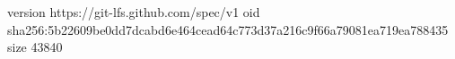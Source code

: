 version https://git-lfs.github.com/spec/v1
oid sha256:5b22609be0dd7dcabd6e464cead64c773d37a216c9f66a79081ea719ea788435
size 43840
